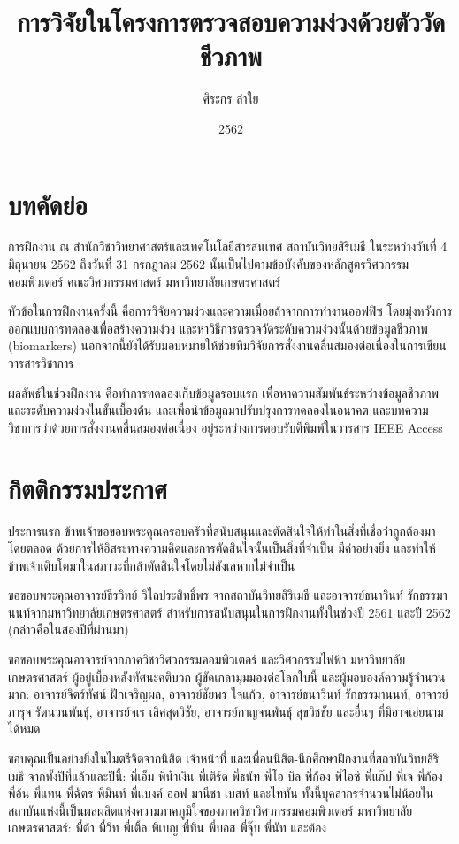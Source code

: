 \documentclass[16pt,a4]{internshipreport}
\title{การวิจัยในโครงการตรวจสอบความง่วงด้วยตัววัดชีวภาพ}
\date{2562}
\author{ศิระกร ลำใย}
\begin{document}
\maketitle

\chapter*{บทคัดย่อ}

การฝึกงาน ณ สำนักวิชาวิทยาศาสตร์และเทคโนโลยีสารสนเทศ สถาบันวิทยสิริเมธี ในระหว่างวันที่ 4 มิถุนายน 2562 ถึงวันที่ 31 กรกฎาคม 2562 นั้นเป็นไปตามข้อบังคับของหลักสูตรวิศวกรรมคอมพิวเตอร์ คณะวิศวกรรมศาสตร์ มหาวิทยาลัยเกษตรศาสตร์

หัวข้อในการฝึกงานครั้งนี้ คือการวิจัยความง่วงและความเมื่อยล้าจากการทำงานออฟฟิซ โดยมุ่งหวังการออกแบบการทดลองเพื่อสร้างความง่วง และหาวิธีการตรวจวัดระดับความง่วงนั้นด้วยข้อมูลชีวภาพ (biomarkers) นอกจากนี้ยังได้รับมอบหมายให้ช่วยทีมวิจัยการสั่งงานคลื่นสมองต่อเนื่องในการเขียนวารสารวิชาการ

ผลลัพธ์ในช่วงฝึกงาน คือทำการทดลองเก็บข้อมูลรอบแรก เพื่อหาความสัมพันธ์ระหว่างข้อมูลชีวภาพและระดับความง่วงในขั้นเบื้องต้น และเพื่อนำข้อมูลมาปรับปรุงการทดลองในอนาคต และบทความวิชาการว่าด้วยการสั่งงานคลื่นสมองต่อเนื่อง อยู่ระหว่างการตอบรับตีพิมพ์ในวารสาร IEEE Access

\chapter*{กิตติกรรมประกาศ}
ประการแรก ข้าพเจ้าขอขอบพระคุณครอบครัวที่สนับสนุนและตัดสินใจให้ทำในสิ่งที่เชื่อว่าถูกต้องมาโดยตลอด ด้วยการให้อิสระทางความคิดและการตัดสินใจนั้นเป็นสิ่งที่จำเป็น มีค่าอย่างยิ่ง และทำให้ข้าพเจ้าเติบโตมาในสภาวะที่กล้าตัดสินใจโดยไม่ลังเลหากไม่จำเป็น

ขอขอบพระคุณอาจารย์ธีรวิทย์ วิไลประสิทธิ์พร จากสถาบันวิทยสิริเมธี และอาจารย์ธนาวินท์ รักธรรมานนท์จากมหาวิทยาลัยเกษตรศาสตร์ สำหรับการสนับสนุนในการฝึกงานทั้งในช่วงปี 2561 และปี 2562 (กล่าวคือในสองปีที่ผ่านมา)

ขอขอบพระคุณอาจารย์จากภาควิชาวิศวกรรมคอมพิวเตอร์ และวิศวกรรมไฟฟ้า มหาวิทยาลัยเกษตรศาสตร์ ผู้อยู่เบื้องหลังทัศนะคติบวก ผู้ขัดเกลามุมมองต่อโลกใบนี้ และผู้มอบองค์ความรู้จำนวนมาก: อาจารย์จิตร์ทัศน์ ฝักเจริญผล, อาจารย์ชัยพร ใจแก้ว, อาจารย์ธนาวินท์ รักธรรมานนท์, อาจารย์ภารุจ รัตนวนพันธุ์, อาจารย์จเร เลิศสุดวิชัย, อาจารย์กาญจนพันธุ์ สุขวิชชัย และอื่นๆ ที่มิอาจเอ่ยนามได้หมด

ขอบคุณเป็นอย่างยิ่งในไมตรีจิตจากนิสิต เจ้าหน้าที่ และเพื่อนนิสิต-นึกศึกษาฝึกงานที่สถาบันวิทยสิริเมธี จากทั้งปีที่แล้วและปีนี้: พี่เอ็ม พี่น้ำเงิน พี่เติร์ด พี่ธนัท  พี่โอ บิล พี่ก้อง พี่ไอซ์ พี่แก๊ป พี่เจ พี่ก้อง พี่อ้น พี่แทน พี่ฉัตร พี่มินท์ พี่แบงค์ ออฟ มานีชา เบสท์ และไททัน ทั้งนี้บุคลากรจำนวนไม่น้อยในสถาบันแห่งนี้เป็นผลผลิตแห่งความภาคภูมิใจของภาควิชาวิศวกรรมคอมพิวเตอร์ มหาวิทยาลัยเกษตรศาสตร์: พี่ต้า พี่วิท พี่เติ้ล พี่เบญ พี่ทิน พี่บอส พี่จุ๊บ พี่นัท และต้อง
\end{document}
